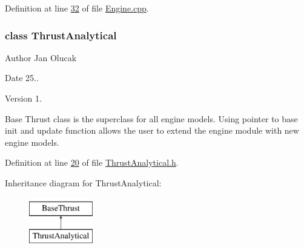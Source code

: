 Definition at line \hyperlink{_engine_8cpp_source_l00032}{32} of file \hyperlink{_engine_8cpp_source}{Engine.\+cpp}.

\label{class_thrust_analytical}
\subsubsection{class Thrust\+Analytical}
\begin{DoxyAuthor}{Author}
Jan Olucak 
\end{DoxyAuthor}
\begin{DoxyDate}{Date}
25.. 
\end{DoxyDate}
\begin{DoxyVersion}{Version}
1.
\end{DoxyVersion}
Base Thrust class is the superclass for all engine models. Using pointer to base init and update function allows the user to extend the engine module with new engine models. 

Definition at line \hyperlink{_thrust_analytical_8h_source_l00020}{20} of file \hyperlink{_thrust_analytical_8h_source}{Thrust\+Analytical.\+h}.

Inheritance diagram for Thrust\+Analytical\+:\begin{figure}[H]
\begin{center}
\leavevmode
\includegraphics[height=2.000000cm]{group___engine}
\end{center}
\end{figure}
